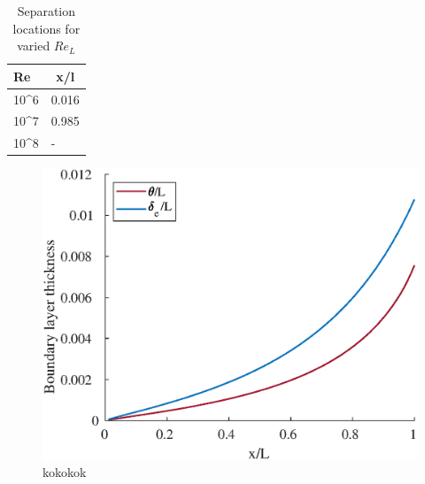 


\begin{table}[]
\centering
\begin{tabular}{l|l}
\hline
Re                    & \multicolumn{1}{c}{x/l} \\ \hline
10\textasciicircum{}6 & 0.016                   \\
10\textasciicircum{}7 & 0.985                   \\
10\textasciicircum{}8 & -                       \\ \hline
\end{tabular}
\caption{Separation locations for varied $Re_L$}
\end{table}


\begin{figure}[H]
\centering
\includegraphics[scale=0.8]{graphs/e5g1.eps}
\caption{kokokok}
\label{e1g1}
\end{figure}

